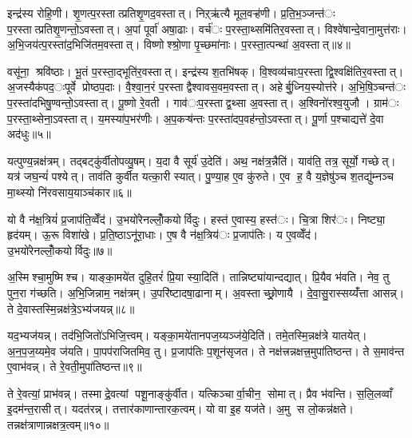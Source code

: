 इन्द्र॑स्य रोहि॒णी। शृ॒णत्प॒रस्तात्प्रतिशृ॒णद॒वस्तात्। निऱ्ऋ॑त्यै मूल॒वऱ्ह॑णी। प्र॒ति॒भ॒ञ्जन्त॑ः प॒रस्तात्प्रतिशृ॒णन्तो॒ऽवस्तात्। अ॒पां पूर्वा॑ अषा॒ढाः। वर्च॑ः प॒रस्ता॒थ्समि॑तिर॒वस्तात्। विश्वे॑षान्दे॒वाना॒मुत्त॑राः। अ॒भि॒जय॑त्प॒रस्ता॑द॒भिजि॑तम॒वस्तात्। विष्णोश्श्रो॒णा पृ॒च्छमा॑नाः। प॒रस्ता॒त्पन्था॑ अ॒वस्तात्॥४॥

वसू॑ना॒ श्रवि॑ष्ठाः। भू॒तं प॒रस्ता॒द्भूति॑र॒वस्तात्। इन्द्र॑स्य श॒तभि॑षक्। वि॒श्वव्य॑चाःप॒रस्ताद्वि॒श्वक्षि॑तिर॒वस्तात्। अ॒जस्यैक॑पद॒ःपूर्वे प्रोष्ठप॒दाः। वै॒श्वा॒न॒रं प॒रस्ताद्वैश्वावस॒वम॒वस्तात्। अहेर्बु॒ध्निय॒स्योत्त॑रे। अ॒भि॒षि॒ञ्चन्त॑ः प॒रस्ता॑दभिषु॒ण्वन्तो॒ऽवस्तात्। पू॒ष्णो रे॒वती। गाव॑ःप॒रस्ताद्व॒थ्सा अ॒वस्तात्। अ॒श्विनो॑रश्व॒युजौ। ग्राम॑ः प॒रस्ता॒थ्सेना॒ऽवस्तात्। य॒मस्या॑प॒भर॑णीः। अ॒प॒कऱ्ष॑न्तः प॒रस्ता॑दप॒वह॑न्तो॒ऽवस्तात्। पू॒र्णा प॒श्चाद्यत्ते॑ दे॒वा अद॑धुः॥५॥


यत्पुण्य॒न्नक्ष॑त्रम्। तद्बट्कु॑र्वीतोपव्यु॒षम्। य॒दा वै सूर्य॑ उ॒देति॑। अथ॒ नक्ष॑त्र॒न्नैति॑। याव॑ति॒ तत्र॒ सूर्यो॒ गच्छेत्। यत्र॑ जघ॒न्यं॑ पश्येत्। ताव॑ति कुर्वीत यत्का॒री स्यात्। पु॒ण्या॒ह ए॒व कु॑रुते। ए॒व ह॒ वै य॒ज्ञेषु॑ञ्च श॒तद्यु॑म्नञ्च मा॒थ्स्यो नि॑रवसाय॒याञ्च॑कार॥६॥

यो वै न॑क्ष॒त्रियं॑ प्र॒जाप॑ति॒व्वेँद॑। उ॒भयो॑रेनल्लोँ॒कयोर्विदुः। हस्त॑ ए॒वास्य॒ हस्त॑ः। चि॒त्रा शिर॑ः। निष्ट्या॒ हृद॑यम्। ऊ॒रू विशा॑खे। प्र॒ति॒ष्ठाऽनू॑रा॒धाः। ए॒ष वै न॑क्ष॒त्रिय॑ः प्र॒जाप॑तिः। य ए॒वव्वेँद॑। उ॒भयो॑रेनल्लोँ॒कयोर्विदुः॥७॥

अ॒स्मिश्चा॒मुष्मिश्च। याङ्का॒मये॑त दुहि॒तरं॑ प्रि॒या स्या॒दिति॑। तान्निष्ट्या॑यान्दद्यात्। प्रि॒यैव भ॑वति। नेव॒ तु पुन॒रा ग॑च्छति। अ॒भि॒जिन्नाम॒ नक्ष॑त्रम्। उ॒परि॑ष्टादषा॒ढानाम्। अ॒वस्ताच्छ्रो॒णायै। दे॒वा॒सु॒रास्सय्यँ॑त्ता आसन्न्। ते दे॒वास्तस्मि॒न्नक्ष॑त्रे॒ऽभ्य॑जयन्न्॥८॥

यद॒भ्यज॑यन्न्। तद॑भि॒जितो॑ऽभिजि॒त्त्वम्। यङ्का॒मये॑तानपज॒य्यञ्ज॑ये॒दिति॑। तमे॒तस्मि॒न्नक्ष॑त्रे यातयेत्। अ॒न॒प॒ज॒य्यमे॒व ज॑यति। पा॒पप॑राजितमिव॒ तु। प्र॒जाप॑तिः प॒शून॑सृजत। ते नक्ष॑त्त्रन्नक्षत्त्र॒मुपा॑तिष्ठन्त। ते स॒माव॑न्त ए॒वाभ॑वन्न्। ते रे॒वती॒मुपा॑तिष्ठन्त॥९॥

ते रे॒वत्यां॒ प्राभ॑वन्न्। तस्माद्रे॒वत्यां पशू॒नाङ्कु॑र्वीत। यत्किञ्चार्वा॒चीन॒ सोमात्। प्रैव भ॑वन्ति। स॒लि॒लव्वाँ इ॒दम॑न्त॒रासीत्। यदत॑रन्न्। तत्तार॑काणान्तारक॒त्वम्। यो वा इ॒ह यज॑ते। अ॒मु स लो॒कन्न॑क्षते। तन्नक्ष॑त्राणान्नक्षत्र॒त्वम्॥१०॥


